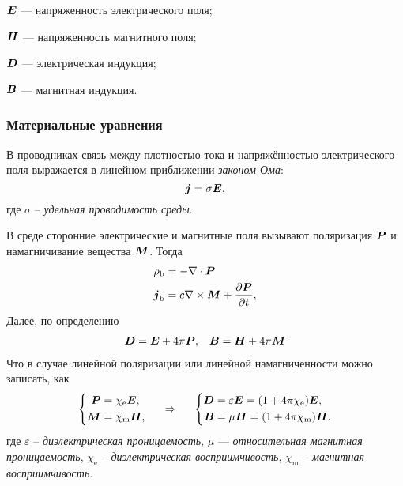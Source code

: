 \begin{description*}
    \item[$\mbox{\boldmath $E$}$]  --- напряженность электрического поля;
    \item[$\mbox{\boldmath $H$}$]  --- напряженность магнитного поля;
    \item[$\mbox{\boldmath $D$}$]  --- электрическая индукция;
    \item[$\mbox{\boldmath $B$}$]  --- магнитная индукция.
\end{description*}

\subsubsection*{Материальные уравнения}

В проводниках связь между плотностью тока и напряжённостью электрического поля выражается в линейном приближении \textit{законом Ома}:
\begin{equation*}
    \mbox{\boldmath $j$} = \sigma \mbox{\boldmath $E$},
\end{equation*}
где $\sigma$ -- \textit{удельная проводимость среды}.

В среде сторонние электрические и магнитные поля вызывают поляризация $\mbox{\boldmath $P$}$ и намагничивание вещества $\mbox{\boldmath $M$}$.
Тогда
\begin{align*}
    \rho_\text{b} &= - \nabla \cdot \mbox{\boldmath $P$} \\
    \mbox{\boldmath $j$}_\text{b} &= c \nabla \times \mbox{\boldmath $M$} + \frac{\partial \mbox{\boldmath $P$}}{\partial t} ,
\end{align*}
Далее, по определению
\begin{align*}
    \mbox{\boldmath $D$} &= \mbox{\boldmath $E$} + 4\pi \mbox{\boldmath $P$}, &\mbox{\boldmath $B$} &= \mbox{\boldmath $H$} + 4 \pi \mbox{\boldmath $M$} \\
\end{align*}
Что в случае линейной поляризации или линейной намагниченности можно записать, как  
$$
    \left\{\begin{aligned}
        \mbox{\boldmath $P$} &= \chi_{\text{e}} \mbox{\boldmath $E$}, \\
        \mbox{\boldmath $M$} &= \chi_{\text{m}} \mbox{\boldmath $H$}, \\
    \end{aligned}\right.
    \hspace{0.5cm} \Rightarrow \hspace{0.5cm} 
    \left\{\begin{aligned}
         \mbox{\boldmath $D$} &= \varepsilon \mbox{\boldmath $E$} = (1 + 4\pi \chi_{\text{e}}) \mbox{\boldmath $E$}, \\
       \mbox{\boldmath $B$} &= \mu \mbox{\boldmath $H$} = (1 + 4 \pi \chi_{\text{m}}) \mbox{\boldmath $H$}.
    \end{aligned}\right.
$$
где $\varepsilon$ -- \textit{ диэлектрическая проницаемость}, $\mu$  — \textit{относительная магнитная проницаемость}, $\chi_{\text{e}}$  -- \textit{диэлектрическая восприимчивость}, $\chi_{\text{m}}$ -- \textit{магнитная восприимчивость}.

